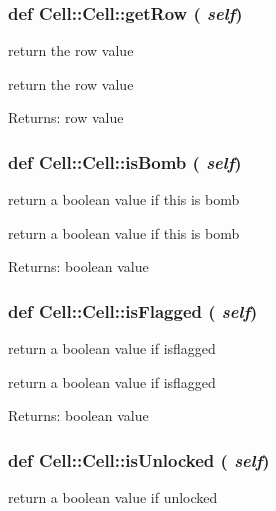 \subsubsection{\setlength{\rightskip}{0pt plus 5cm}def Cell::Cell::get\-Row ( {\em self})}\label{classCell_1_1Cell_2bba314fe899afe15df9d030c2977fda}


return the row value 

return the row value \begin{Desc}
\item[Returns:]row value \end{Desc}
\subsubsection{\setlength{\rightskip}{0pt plus 5cm}def Cell::Cell::is\-Bomb ( {\em self})}\label{classCell_1_1Cell_aa16af320957adde582767e8cc264567}


return a boolean value if this is bomb 

return a boolean value if this is bomb \begin{Desc}
\item[Returns:]boolean value \end{Desc}
\subsubsection{\setlength{\rightskip}{0pt plus 5cm}def Cell::Cell::is\-Flagged ( {\em self})}\label{classCell_1_1Cell_9a6932090bd703869334081448f7ae16}


return a boolean value if isflagged 

return a boolean value if isflagged \begin{Desc}
\item[Returns:]boolean value \end{Desc}
\subsubsection{\setlength{\rightskip}{0pt plus 5cm}def Cell::Cell::is\-Unlocked ( {\em self})}\label{classCell_1_1Cell_e8ff6b3c9200cc387da88d45d5070d57}


return a boolean value if unlocked 

